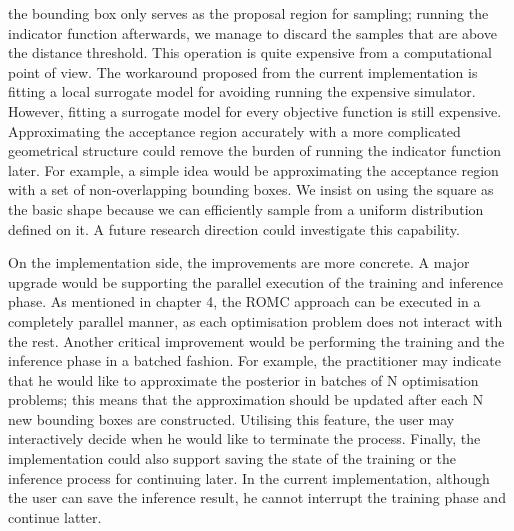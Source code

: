 the bounding box only serves as the proposal region for sampling; running the indicator function afterwards, we manage to discard the samples that are above the distance threshold. This operation is quite expensive from a computational point of view. The workaround proposed from the current implementation is fitting a local surrogate model for avoiding running the expensive simulator. However, fitting a surrogate model for every objective function is still expensive. Approximating the acceptance region accurately with a more complicated geometrical structure could remove the burden of running the indicator function later. For example, a simple idea would be approximating the acceptance region with a set of non-overlapping bounding boxes. We insist on using the square as the basic shape because we can efficiently sample from a uniform distribution defined on it. A future research direction could investigate this capability.


On the implementation side, the improvements are more concrete. A major upgrade would be supporting the parallel execution of the training and inference phase. As mentioned in chapter 4, the ROMC approach can be executed in a completely parallel manner, as each optimisation problem does not interact with the rest. Another critical improvement would be performing the training and the inference phase in a batched fashion. For example, the practitioner may indicate that he would like to approximate the posterior in batches of N optimisation problems; this means that the approximation should be updated after each N new bounding boxes are constructed. Utilising this feature, the user may interactively decide when he would like to terminate the process. Finally, the implementation could also support saving the state of the training or the inference process for continuing later. In the current implementation, although the user can save the inference result, he cannot interrupt the training phase and continue latter.